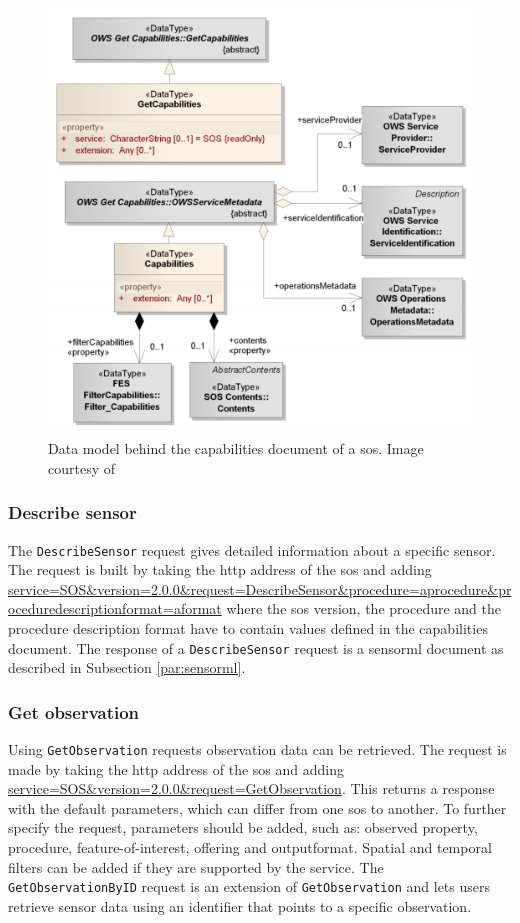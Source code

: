 \begin{figure}
	\centering
	\includegraphics[width=0.7\linewidth]{figs/SOS_2_dataModel_GetCapabilities.PNG}
	\caption{Data model behind the capabilities document of a \acs*{sos}. Image courtesy of \cite{SW:OGC2}}
	\label{fig:Capabilities}
\end{figure}

\subsubsection{Describe sensor}

\begin{sloppypar}
	The \texttt{DescribeSensor} request gives detailed information about a specific sensor. The request is built by taking the \ac{http} address of the \ac{sos} and adding \url{service=SOS\&version=2.0.0\&request=DescribeSensor\&procedure=aprocedure\&proceduredescriptionformat=aformat} where the \ac{sos} version, the procedure and the procedure description format have to contain values defined in the capabilities document. The response of a \texttt{DescribeSensor} request is a \ac{sensorml} document as described in Subsection \ref{par:sensorml}.
\end{sloppypar}


\subsubsection{Get observation}
\label{par:getObservation}

Using \texttt{GetObservation} requests observation data can be retrieved. The request is made by taking the \ac{http} address of the \ac{sos} and adding \url{service=SOS\&version=2.0.0\&request=GetObservation}. This returns a response with the default parameters, which can differ from one \ac{sos} to another. To further specify the request, parameters should be added, such as: observed property, procedure, feature-of-interest, offering and outputformat. Spatial and temporal filters can be added if they are supported by the service. The \texttt{GetObservationByID} request is an extension of \texttt{GetObservation} and lets users retrieve sensor data using an identifier that points to a specific observation.

